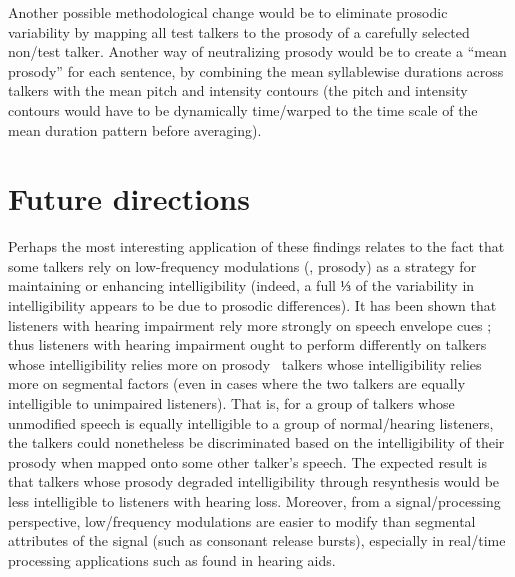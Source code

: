 Another possible methodological change would be to eliminate prosodic variability by mapping all test talkers to the prosody of a carefully selected non\-/test talker.  Another way of neutralizing prosody would be to create a “mean prosody” for each sentence, by combining the mean syllablewise durations across talkers with the mean pitch and intensity contours (the pitch and intensity contours would have to be dynamically time\-/warped to the time scale of the mean duration pattern before averaging).


\section{Future directions}
Perhaps the most interesting application of these findings relates to the fact that some talkers rely on low-frequency modulations (\ie, prosody) as a strategy for maintaining or enhancing intelligibility (indeed, a full ⅓ of the variability in intelligibility appears to be due to prosodic differences).  It has been shown that listeners with hearing impairment rely more strongly on speech envelope cues \citep{LorenziEtAl2006}; thus listeners with hearing impairment ought to perform differently on talkers whose intelligibility relies more on prosody \vs\ talkers whose intelligibility relies more on segmental factors (even in cases where the two talkers are equally intelligible to unimpaired listeners).  That is, for a group of talkers whose unmodified speech is equally intelligible to a group of normal\-/hearing listeners, the talkers could nonetheless be discriminated based on the intelligibility of their prosody when mapped onto some other talker’s speech.  The expected result is that talkers whose prosody degraded intelligibility through resynthesis would be less intelligible to listeners with hearing loss.  Moreover, from a signal\-/processing perspective, low\-/frequency modulations are easier to modify than segmental attributes of the signal (such as consonant release bursts), especially in real\-/time processing applications such as found in hearing aids.

